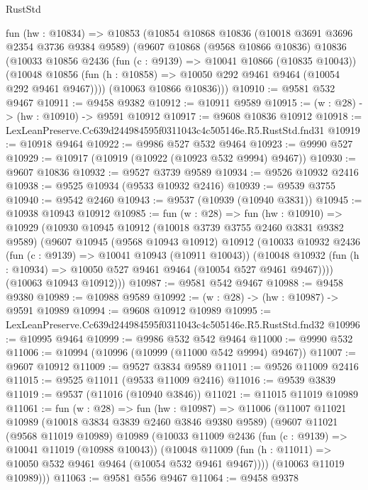\begin{lexlean}{RustStd}
\begin{coremodule}
  fun (hw : @10834) =>
  @10853
    (@10854
      @10868
      @10836
      (@10018 @3691 @3696 @2354 @3736 @9384 @9589)
      (@9607
        @10868
        (@9568 @10866 @10836)
        @10836
        (@10033
          @10856
          @2436
          (fun (c : @9139) => @10041 @10866 (@10835 @10043))
          (@10048 @10856 (fun (h : @10858) => @10050 @292 @9461 @9464 (@10054 @292 @9461 @9467))))
        (@10063 @10866 @10836)))
@10910 := @9581 @532 @9467
@10911 := @9458 @9382
@10912 := @10911 @9589
@10915 := (w : @28) -> (hw : @10910) -> @9591 @10912
@10917 := @9608 @10836 @10912
@10918 := LexLeanPreserve.Cc639d244984595f0311043c4c505146e.R5.RustStd.fnd31
@10919 := @10918 @9464
@10922 := @9986 @527 @532 @9464
@10923 := @9990 @527
@10929 := @10917 (@10919 (@10922 (@10923 @532 @9994) @9467))
@10930 := @9607 @10836
@10932 := @9527 @3739 @9589
@10934 := @9526 @10932 @2416
@10938 := @9525 @10934 (@9533 @10932 @2416)
@10939 := @9539 @3755
@10940 := @9542 @2460
@10943 := @9537 (@10939 (@10940 @3831))
@10945 := @10938 @10943 @10912
@10985 := fun (w : @28) =>
  fun (hw : @10910) =>
  @10929
    (@10930
      @10945
      @10912
      (@10018 @3739 @3755 @2460 @3831 @9382 @9589)
      (@9607
        @10945
        (@9568 @10943 @10912)
        @10912
        (@10033
          @10932
          @2436
          (fun (c : @9139) => @10041 @10943 (@10911 @10043))
          (@10048 @10932 (fun (h : @10934) => @10050 @527 @9461 @9464 (@10054 @527 @9461 @9467))))
        (@10063 @10943 @10912)))
@10987 := @9581 @542 @9467
@10988 := @9458 @9380
@10989 := @10988 @9589
@10992 := (w : @28) -> (hw : @10987) -> @9591 @10989
@10994 := @9608 @10912 @10989
@10995 := LexLeanPreserve.Cc639d244984595f0311043c4c505146e.R5.RustStd.fnd32
@10996 := @10995 @9464
@10999 := @9986 @532 @542 @9464
@11000 := @9990 @532
@11006 := @10994 (@10996 (@10999 (@11000 @542 @9994) @9467))
@11007 := @9607 @10912
@11009 := @9527 @3834 @9589
@11011 := @9526 @11009 @2416
@11015 := @9525 @11011 (@9533 @11009 @2416)
@11016 := @9539 @3839
@11019 := @9537 (@11016 (@10940 @3846))
@11021 := @11015 @11019 @10989
@11061 := fun (w : @28) =>
  fun (hw : @10987) =>
  @11006
    (@11007
      @11021
      @10989
      (@10018 @3834 @3839 @2460 @3846 @9380 @9589)
      (@9607
        @11021
        (@9568 @11019 @10989)
        @10989
        (@10033
          @11009
          @2436
          (fun (c : @9139) => @10041 @11019 (@10988 @10043))
          (@10048 @11009 (fun (h : @11011) => @10050 @532 @9461 @9464 (@10054 @532 @9461 @9467))))
        (@10063 @11019 @10989)))
@11063 := @9581 @556 @9467
@11064 := @9458 @9378

\end{coremodule}
\end{lexlean}
